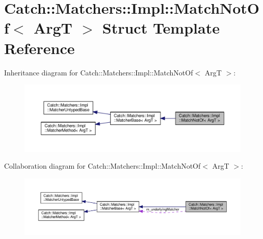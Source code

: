 \hypertarget{structCatch_1_1Matchers_1_1Impl_1_1MatchNotOf}{}\section{Catch\+:\+:Matchers\+:\+:Impl\+:\+:Match\+Not\+Of$<$ ArgT $>$ Struct Template Reference}
\label{structCatch_1_1Matchers_1_1Impl_1_1MatchNotOf}


Inheritance diagram for Catch\+:\+:Matchers\+:\+:Impl\+:\+:Match\+Not\+Of$<$ ArgT $>$\+:
\nopagebreak
\begin{figure}[H]
\begin{center}
\leavevmode
\includegraphics[width=350pt]{structCatch_1_1Matchers_1_1Impl_1_1MatchNotOf__inherit__graph}
\end{center}
\end{figure}


Collaboration diagram for Catch\+:\+:Matchers\+:\+:Impl\+:\+:Match\+Not\+Of$<$ ArgT $>$\+:
\nopagebreak
\begin{figure}[H]
\begin{center}
\leavevmode
\includegraphics[width=350pt]{structCatch_1_1Matchers_1_1Impl_1_1MatchNotOf__coll__graph}
\end{center}
\end{figure}
